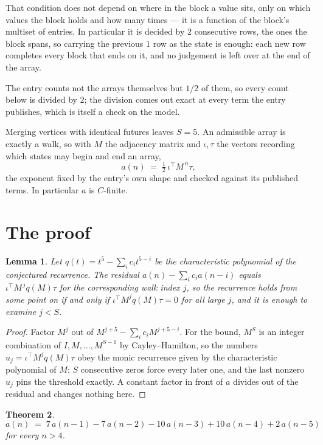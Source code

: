 \documentclass[11pt,a4paper]{article}
\theoremstyle{plain}
\newtheorem{theorem}{Theorem}
\newtheorem{lemma}[theorem]{Lemma}
\theoremstyle{definition}
\begin{document}
That condition does not depend on where in the block a value sits, only on which values the block holds and how many times --- it is a function of the block's multiset of entries. In particular it is decided by $2$ consecutive rows, the ones the block spans, so carrying the previous $1$ row as the state is enough: each new row completes every block that ends on it, and no judgement is left over at the end of the array.

The entry counts not the arrays themselves but $1/2$ of them, so every count below is divided by $2$; the division comes out exact at every term the entry publishes, which is itself a check on the model.

Merging vertices with identical futures leaves $S=5$. An admissible array is exactly a walk, so with $M$ the adjacency matrix and $\iota,\tau$ the vectors recording which states may begin and end an array,
\[
a(n)\;=\;\tfrac{1}{2}\,\iota^{\!\top}M^{\,n}\tau ,
\]
the exponent fixed by the entry's own shape and checked against its published terms. In
particular $a$ is $C$-finite.

\section{The proof}

\begin{lemma}\label{lem:crit}
Let $q(t)=t^{5}-\sum_i c_it^{5-i}$ be the characteristic polynomial of the
conjectured recurrence. The residual $a(n)-\sum_ic_ia(n-i)$ equals
$\iota^{\!\top}M^{\,j}q(M)\tau$ for the corresponding walk index $j$, so the recurrence
holds from some point on if and only if $\iota^{\!\top}M^{j}q(M)\tau=0$ for all large $j$,
and it is enough to examine $j<S$.
\end{lemma}

\begin{proof}
Factor $M^{j}$ out of $M^{j+5}-\sum_ic_iM^{j+5-i}$. For the bound, $M^{S}$
is an integer combination of $I,M,\dots,M^{S-1}$ by Cayley--Hamilton, so the numbers
$u_j=\iota^{\!\top}M^{j}q(M)\tau$ obey the monic recurrence given by the characteristic
polynomial of $M$; $S$ consecutive zeros force every later one, and the last nonzero $u_j$
pins the threshold exactly. A constant factor in front of $a$ divides out of the residual and
changes nothing here.
\end{proof}

\begin{theorem}
\[
a(n)\;=\;7\,a(n-1) - 7\,a(n-2) - 10\,a(n-3) + 10\,a(n-4) + 2\,a(n-5)
\]
for every $n>4$.
\end{theorem}
\end{document}
